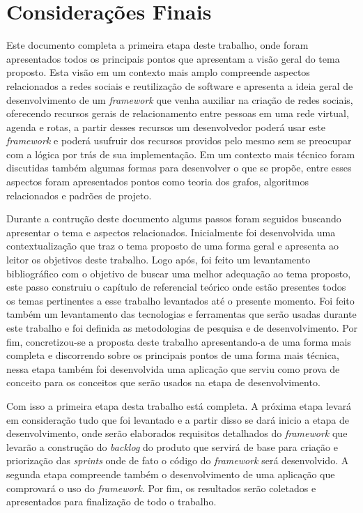 \chapter{Considerações Finais}

 Este documento completa a primeira etapa deste trabalho, onde foram apresentados todos os principais pontos que apresentam a visão geral do tema proposto. Esta visão em um contexto mais amplo compreende aspectos relacionados a redes sociais e reutilização de software e apresenta a ideia geral de desenvolvimento de um \textit{framework} que venha auxiliar na criação de redes sociais, oferecendo recursos gerais de relacionamento entre pessoas em uma rede virtual, agenda e rotas, a partir desses recursos um desenvolvedor poderá usar este \textit{framework} e poderá usufruir dos recursos providos pelo mesmo sem se preocupar com a lógica por trás de sua implementação. Em um contexto mais técnico foram discutidas também algumas formas para desenvolver o que se propõe, entre esses aspectos foram apresentados pontos como teoria dos grafos, algoritmos relacionados e padrões de projeto.

Durante a contrução deste documento algums passos foram seguidos buscando apresentar o tema e aspectos relacionados. Inicialmente foi desenvolvida uma contextualização que traz o tema proposto de uma forma geral e apresenta ao leitor os objetivos deste trabalho. Logo após, foi feito um levantamento bibliográfico com o objetivo de buscar uma melhor adequação ao tema proposto, este passo construiu o capítulo de referencial teórico onde estão presentes todos os temas pertinentes a esse trabalho levantados até o presente momento. Foi feito também um levantamento das tecnologias e ferramentas que serão usadas durante este trabalho e foi definida as metodologias de pesquisa e de desenvolvimento. Por fim, concretizou-se a proposta deste trabalho apresentando-a de uma forma mais completa e discorrendo sobre os principais pontos de uma forma mais técnica, nessa etapa também foi desenvolvida uma aplicação que serviu como prova de conceito para os conceitos que serão usados na etapa de desenvolvimento.

Com isso a primeira etapa desta trabalho está completa. A próxima etapa levará em consideração tudo que foi levantado e a partir disso se dará inicio a etapa de desenvolvimento, onde serão elaborados requisitos detalhados do \textit{framework} que levarão a construção do \textit{backlog} do produto que servirá de base para criação e priorização das \textit{sprints} onde de fato o código do \textit{framework} será desenvolvido. A segunda etapa compreende também o desenvolvimento de uma aplicação que comprovará o uso do \textit{framework}. Por fim, os resultados serão coletados e apresentados para finalização de todo o trabalho.
